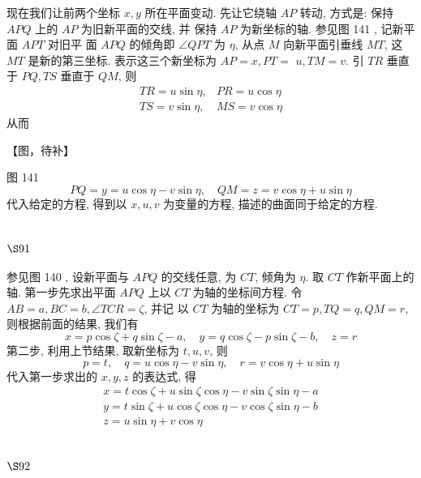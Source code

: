 现在我们让前两个坐标 $x, y$ 所在平面变动. 先让它绕轴 $A P$ 转动, 方式是: 保持 $A P Q$ 上的 $A P$ 为旧新平面的交线, 并 保持 $A P$ 为新坐标的轴. 参见图 141 , 记新平面 $A P T$ 对旧平 面 $A P Q$ 的倾角即 $\angle Q P T$ 为 $\eta$, 从点 $M$ 向新平面引垂线 $M T$, 这 $M T$ 是新的第三坐标. 表示这三个新坐标为 $A P=x, P T=$ $u, T M=v$. 引 $T R$ 垂直于 $P Q, T S$ 垂直于 $Q M$, 则
\[
\begin{array}{ll}
T R=u \sin \eta, & P R=u \cos \eta \\
T S=v \sin \eta, & M S=v \cos \eta
\end{array}
\]
从而


【图，待补】

图 141
\[
P Q=y=u \cos \eta-v \sin \eta, \quad Q M=z=v \cos \eta+u \sin \eta
\]
代入给定的方程, 得到以 $x, u, v$ 为变量的方程, 描述的曲面同于给定的方程.

\section{$\S 91$}

参见图 140 , 设新平面与 $A P Q$ 的交线任意, 为 $C T$, 倾角为 $\eta$. 取 $C T$ 作新平面上的轴. 第一步先求出平面 $A P Q$ 上以 $C T$ 为轴的坐标间方程. 令 $A B=a, B C=b, \angle T C R=\zeta$, 并记 以 $C T$ 为轴的坐标为 $C T=p, T Q=q, Q M=r$, 则根据前面的结果, 我们有
\[
x=p \cos \zeta+q \sin \zeta-a, \quad y=q \cos \zeta-p \sin \zeta-b, \quad z=r
\]
第二步, 利用上节结果, 取新坐标为 $t, u, v$, 则
\[
p=t, \quad q=u \cos \eta-v \sin \eta, \quad r=v \cos \eta+u \sin \eta
\]
代入第一步求出的 $x, y, z$ 的表达式, 得
\[
\begin{gathered}
x=t \cos \zeta+u \sin \zeta \cos \eta-v \sin \zeta \sin \eta-a \\
y=t \sin \zeta+u \cos \zeta \cos \eta-v \cos \zeta \sin \eta-b \\
z=u \sin \eta+v \cos \eta
\end{gathered}
\]
\section{$\S 92$}

